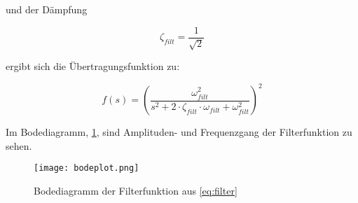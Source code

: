 
und der Dämpfung

\begin{equation}
	\zeta_{filt} = \frac{1}{\sqrt{2}}
\end{equation}

ergibt sich die Übertragungsfunktion zu:

\begin{equation} \label{eq:filter}
	f(s) = \left(\frac{\omega_{filt}^2}{s^2+2 \cdot \zeta_{filt} \cdot \omega_{filt} +\omega_{filt}^2}\right)^2
\end{equation}

Im Bodediagramm, \cref{fig:bodeplot}, sind Amplituden- und Frequenzgang der Filterfunktion zu sehen.

\begin{figure}[h!]
	\centering
	\texttt{[image: bodeplot.png]}
	\caption{Bodediagramm der Filterfunktion aus \cref{eq:filter}}
	\label{fig:bodeplot}
\end{figure}